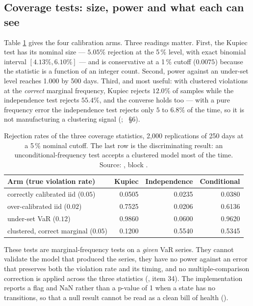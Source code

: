 \documentclass[11pt,a4paper]{article}
\begin{document}
\subsection{Coverage tests: size, power and what each can see}
Table \ref{tab:kupiec} gives the four calibration arms. Three readings matter. First, the Kupiec test has
its nominal size --- $5.05\%$ rejection at the 5\,\% level, with exact binomial interval
$[4.13\%, 6.10\%]$ --- and is conservative at a 1\,\% cutoff ($0.0075$) because the statistic
is a function of an integer count. Second, power against an under-set level reaches 1.000 by
500 days. Third, and most useful: with clustered violations at the \emph{correct} marginal
frequency, Kupiec rejects $12.0\%$ of samples while the independence test rejects $55.4\%$,
and the converse holds too --- with a pure frequency error the independence test rejects only
$5$ to $6.8\%$ of the time, so it is not manufacturing a clustering signal
(;
~\S6).

\begin{table}[t]
\caption[Rejection rates of the three coverage statistics, 2{,}000 replications of 250 da]{Rejection rates of the three coverage statistics, 2{,}000 replications of 250 days at
a 5\,\% nominal cutoff. The last row is the discriminating result: an unconditional-frequency
test accepts a clustered model most of the time. Source:
, block
.}
\label{tab:kupiec}
\centering\small
\begin{tabular}{lrrr}
\toprule
Arm (true violation rate) & Kupiec & Independence & Conditional \\
\midrule
correctly calibrated iid ($0.05$) & 0.0505 & 0.0235 & 0.0380 \\
over-calibrated iid ($0.02$) & 0.7525 & 0.0206 & 0.6136 \\
under-set VaR ($0.12$) & 0.9860 & 0.0600 & 0.9620 \\
clustered, correct marginal ($0.05$) & 0.1200 & 0.5540 & 0.5345 \\
\bottomrule
\end{tabular}
\end{table}

These tests are marginal-frequency tests on a \emph{given} VaR series. They cannot validate
the model that produced the series, they have no power against an error that preserves both
the violation rate and its timing, and no multiple-comparison correction is applied across the
three statistics (, item 34). The implementation reports a
 flag and NaN rather than a p-value of 1 when a state has no transitions, so
that a null result cannot be read as a clean bill of health ().
\end{document}
